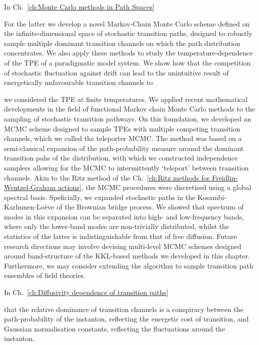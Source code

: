 \documentclass[]{cam-thesis}
\begin{document}
In Ch.~\ref{ch:Monte Carlo methods in Path Spaces}

 For the latter we develop a novel Markov-Chain Monte Carlo scheme defined on the infinite-dimensional space of stochastic transition paths, designed to robustly sample multiple dominant transition channels on which the path distribution concentrates. We also apply these methods to study the temperature-dependence of the TPE of a paradigmatic model system. We show how that the competition of stochastic fluctuation against drift can lead to the unintuitive result of energetically unfavourable transition channels to 


we considered the TPE at finite temperatures. We applied recent mathematical developments in the field of functional Markov chain Monte Carlo methods to the sampling of stochastic transition pathways. On this foundation, we developed an MCMC scheme designed to sample TPEs with multiple competing transition channels, which we called the teleporter MCMC. The method was based on a semi-classical expansion of the path-probability measure around the dominant transition pahs of the distribution, with which we constructed independence samplers allowing for the MCMC to intermittently `teleport' between transition channels. Akin to the Ritz method of the Ch.~\ref{ch:Ritz methods for Freidlin-Wentzel-Graham actions}, the MCMC procedures were discretised using a global spectral basis. Speficially, we expanded stochastic paths in the Kosambi-Karhunen-Lo\`eve of the Brownian bridge process. We showed that spectrum of modes in this expansion can be separated into high- and low-frequency bands, where only the lower-band modes are non-trivially distributed, whilst the statistics of the latter is indistinguishable from that of free diffusion. Future research directions may involve devising multi-level MCMC schemes designed around band-structure of the KKL-based methods we developed in this chapter. Furthermore, we may consider extending the algorithm to sample transition path ensembles of field theories. 



In Ch.~\ref{ch:Diffusivity dependence of transition paths}

 that the relative dominance of transition channels is a conspiracy between the path-probability of the instanton, reflecting the energetic cost of transition, and Gaussian normalisation constants, reflecting the fluctuations around the instanton.
\end{document}
